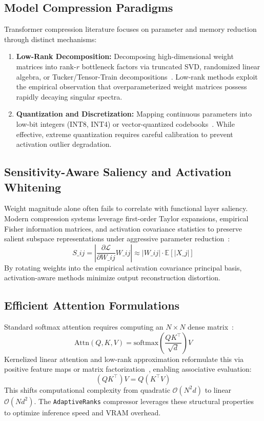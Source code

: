 \subsection{Model Compression Paradigms}
Transformer compression literature focuses on parameter and memory reduction through distinct mechanisms:
\begin{enumerate}
\item \textbf{Low-Rank Decomposition:} Decomposing high-dimensional weight matrices into rank-$r$ bottleneck factors via truncated SVD, randomized linear algebra, or Tucker/Tensor-Train decompositions~\citep{eckart1936,halko2011,wang2024svdllm,yuan2023asvd,hsu2022fwsvd,chen2021drone,lan2020albert,novikov2015tensor}. Low-rank methods exploit the empirical observation that overparameterized weight matrices possess rapidly decaying singular spectra.
\item \textbf{Quantization and Discretization:} Mapping continuous parameters into low-bit integers (INT8, INT4) or vector-quantized codebooks~\citep{frantar2023gptq,lin2024awq,xiao2023smoothquant}. While effective, extreme quantization requires careful calibration to prevent activation outlier degradation.
\end{enumerate}

\subsection{Sensitivity-Aware Saliency and Activation Whitening}
Weight magnitude alone often fails to correlate with functional layer saliency. Modern compression systems leverage first-order Taylor expansions, empirical Fisher information matrices, and activation covariance statistics to preserve salient subspace representations under aggressive parameter reduction~\citep{kirkpatrick2017,molchanov2019}:
\[
S\_{ij} = \left| \frac{\partial \mathcal{L}}{\partial W\_{ij}} W\_{ij} \right| \approx |W\_{ij}| \cdot \mathbb{E}[|X\_j|]
\]
By rotating weights into the empirical activation covariance principal basis, activation-aware methods minimize output reconstruction distortion.

\subsection{Efficient Attention Formulations}
Standard softmax attention requires computing an $N \times N$ dense matrix~\citep{vaswani2017}:
\[
\text{Attn}(Q, K, V) = \text{softmax}\left(\frac{Q K^\top}{\sqrt{d}}\right) V
\]
Kernelized linear attention and low-rank approximation reformulate this via positive feature maps or matrix factorization~\citep{katharopoulos2020,choromanski2021,xiong2021nystromformer}, enabling associative evaluation:
\[
(Q K^\top) V = Q (K^\top V)
\]
This shifts computational complexity from quadratic $\mathcal{O}(N^2 d)$ to linear $\mathcal{O}(N d^2)$. The \texttt{AdaptiveRanks} compressor leverages these structural properties to optimize inference speed and VRAM overhead.


